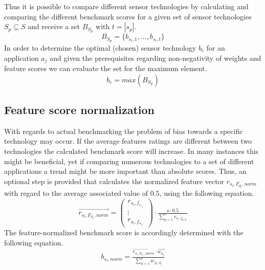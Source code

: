 Thus it is possible to compare different sensor technologies by calculating and comparing the different benchmark scores for a given set of sensor technologies $S_p\subseteq S$ and receive a set $B_{S_p}$ with $t=\left | s_p\right |$.
\begin{equation}
B_{S_p}=\{b_{s_l,1},\hdots,b_{s_l,t}\}
\end{equation}
In order to determine the optimal (chosen) sensor technology $b_c$ for an application $a_j$ and given the prerequisites regarding non-negativity of weights and feature scores we can evaluate the set for the maximum element.
\begin{equation}
b_c=max(B_{S_p})
\end{equation}
\subsection{Feature score normalization}
With regards to actual benchmarking the problem of bias towards a specific technology may occur. If the average features ratings are different between two technologies the calculated benchmark score will increase. In many instances this might be beneficial, yet if comparing numerous technologies to a set of different applications a trend might be more important than absolute scores. Thus, an optional step is provided that calculates the normalized feature vector $r_{s_l,F_{d_i},norm}$ with regard to the average associated value of $0.5$, using the following equation.
\begin{equation}
\overrightarrow{r_{s_l,F_{d_i},norm}}= \begin{pmatrix}
r_{s_l,f_{1,_i}}\\ 
\vdots\\
r_{s_l,f_{o,_i}}
\end{pmatrix}
\cdot \tfrac{o\cdot0.5}{\sum_{p=1}^{o}r_{s_l,f_{p,d_i}}}
\end{equation} 
The feature-normalized benchmark score is accordingly determined with the following equation.
\begin{equation}
b_{s_l,norm}=\tfrac{\overrightarrow{r_{s_l,F_{d_i},norm}}\cdot \overrightarrow{w_{a_j}}}{\sum_{k=1}^{o}w_{f_k,a_j}}
\end{equation}
